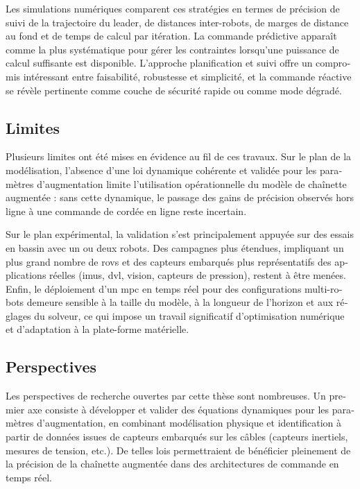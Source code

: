 \begin{otherlanguage}{french}
	Les simulations numériques comparent ces stratégies en termes de précision de suivi de la
	trajectoire du leader, de distances inter-robots, de marges de distance au fond et de temps de
	calcul par itération. La commande prédictive apparaît comme la plus systématique pour gérer les
	contraintes lorsqu'une puissance de calcul suffisante est disponible. L'approche planification et
	suivi offre un compromis intéressant entre faisabilité, robustesse et simplicité, et la commande
	réactive se révèle pertinente comme couche de sécurité rapide ou comme mode dégradé.

	\subsection{Limites}

	Plusieurs limites ont été mises en évidence au fil de ces travaux. Sur le plan de la modélisation,
	l'absence d'une loi dynamique cohérente et validée pour les paramètres d'augmentation limite
	l'utilisation opérationnelle du modèle de chaînette augmentée : sans cette dynamique, le passage
	des gains de précision observés hors ligne à une commande de cordée en ligne reste incertain.

	Sur le plan expérimental, la validation s'est principalement appuyée sur des essais en bassin avec
	un ou deux robots. Des campagnes plus étendues, impliquant un plus grand nombre de \acp{rov} et des
	capteurs embarqués plus représentatifs des applications réelles (\acp{imu}, \ac{dvl}, vision,
	capteurs de pression), restent à être menées. Enfin, le déploiement d'un \ac{mpc} en temps réel
	pour des configurations multi-robots demeure sensible à la taille du modèle, à la longueur de
	l'horizon et aux réglages du solveur, ce qui impose un travail significatif d'optimisation
	numérique et d'adaptation à la plate-forme matérielle.

	\subsection{Perspectives}

	Les perspectives de recherche ouvertes par cette thèse sont nombreuses. Un premier axe consiste à
	développer et valider des équations dynamiques pour les paramètres d'augmentation, en combinant
	modélisation physique et identification à partir de données issues de capteurs embarqués sur les
	câbles (capteurs inertiels, mesures de tension, etc.). De telles lois permettraient de bénéficier
	pleinement de la précision de la chaînette augmentée dans des architectures de commande en temps
	réel.


\end{otherlanguage}
